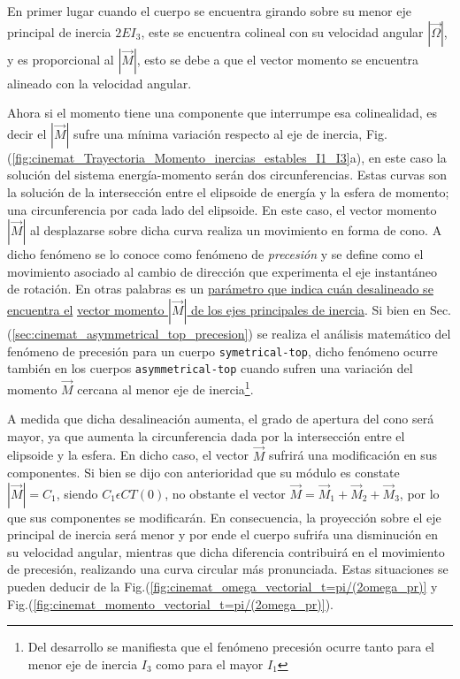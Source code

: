 \documentclass[oneside,a4paper,english,links]{amca}
\begin{document}
En primer lugar cuando el cuerpo se encuentra girando sobre su menor eje principal de inercia $2EI_3$, este se encuentra colineal con su velocidad angular $|\vec{\Omega}|$, y es proporcional al $|\vec{M}|$, esto se debe a que el vector momento se encuentra alineado con la velocidad angular. 

Ahora si el momento tiene una componente que interrumpe esa colinealidad, es decir el $|\vec{M}|$ sufre una m\'inima variaci\'on respecto al eje de inercia, Fig.(\ref{fig:cinemat_Trayectoria_Momento_inercias_estables_I1_I3}a), en este caso la soluci\'on del sistema energ\'ia-momento ser\'an dos circunferencias. Estas curvas son la soluci\'on de la intersecci\'on entre el elipsoide de energ\'ia y la esfera de momento; una circunferencia por cada lado del elipsoide. En este caso, el vector momento $|\vec{M}|$ al desplazarse sobre dicha curva realiza un movimiento en forma de cono. A dicho fen\'omeno se lo conoce como fen\'omeno de \textit{precesi\'on} y se define como el movimiento asociado al cambio de direcci\'on que experimenta el eje instant\'aneo de rotaci\'on. En otras palabras es un \underline{par\'ametro que indica cu\'an desalineado se encuentra el} \underline{vector momento $|\vec{M}|$ de los ejes principales de inercia}.
Si bien en Sec.(\ref{sec:cinemat_asymmetrical_top_precesion}) se realiza el an\'alisis matem\'atico del fen\'omeno de precesi\'on para un cuerpo \texttt{symetrical-top}, dicho fen\'omeno ocurre tambi\'en en los cuerpos \texttt{asymmetrical-top} cuando sufren una variaci\'on del momento $\vec{M}$ cercana al menor eje de inercia\footnote{Del desarrollo se manifiesta que el fen\'omeno precesi\'on ocurre tanto para el menor eje de inercia $I_3$ como para el mayor $I_1$}.

A medida que dicha desalineaci\'on aumenta, el grado de apertura del cono ser\'a mayor, ya que aumenta la circunferencia dada por la intersecci\'on entre el elipsoide y la esfera. En dicho caso, el vector $\vec{M}$ sufrir\'a una modificaci\'on en sus componentes. Si bien se dijo con anterioridad que su m\'odulo es constate $|\vec{M}|=C_1$, siendo $C_1\epsilon CT(0)$, no obstante el vector $\vec{M}=\vec{M}_1+\vec{M}_2+\vec{M}_3$, por lo que sus componentes se modificar\'an. En consecuencia, la proyecci\'on sobre el eje principal de inercia ser\'a menor y por ende el cuerpo sufri\'ra una disminuci\'on en su velocidad angular, mientras que dicha diferencia contribuir\'a en el movimiento de precesi\'on, realizando una curva circular m\'as pronunciada. Estas situaciones se pueden deducir de la Fig.(\ref{fig:cinemat_omega_vectorial_t=pi/(2omega_pr)} y Fig.(\ref{fig:cinemat_momento_vectorial_t=pi/(2omega_pr)}).
\end{document}

